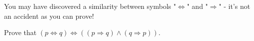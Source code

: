 
You may have discovered a similarity between symbols "$\Leftrightarrow$" and "$\Rightarrow$" - it's not an accident as you can prove!
\begin{exercise}
  Prove that $(p\Leftrightarrow q)\Leftrightarrow ((p\Rightarrow q) \wedge (q\Rightarrow p))$.
\end{exercise}

%

